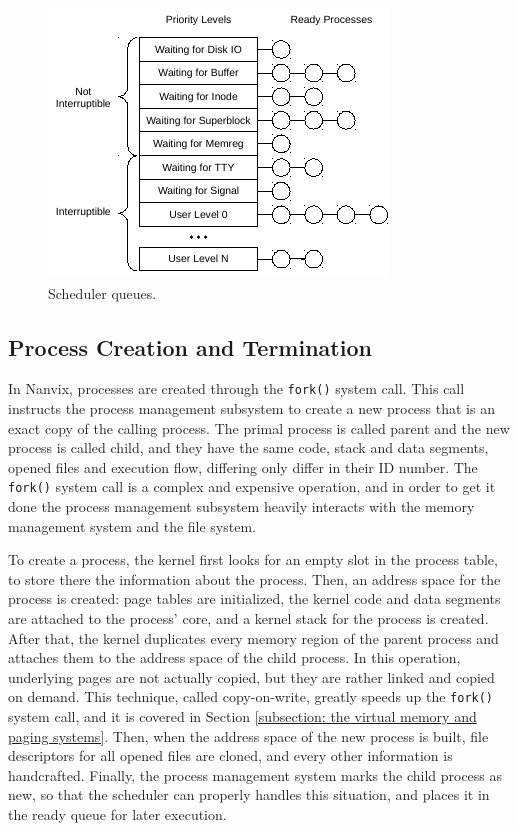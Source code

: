\documentclass[10pt,a4paper]{article}
\begin{document}
\begin{figure}[t]
	\centering
	\includegraphics[scale=1.4]{img/scheduler}
	\caption{Scheduler queues.}
	\label{figure: scheduler}
\end{figure}

\subsection{Process Creation and Termination}

In Nanvix, processes are created through the \texttt{fork()} system call. This call instructs the process management subsystem to create a new process that is an exact copy of the calling process. The primal process is called parent and the new process is called child, and they have the same code, stack and data segments, opened files and execution flow, differing only differ in their ID number. The \texttt{fork()} system call is a complex and expensive operation, and in order to get it done the process management subsystem heavily interacts with the memory management system and the file system.

To create a process, the kernel first looks for an empty slot in the process table, to store there the information about the process. Then, an address space for the process is created: page tables are initialized, the kernel code and data segments are attached to the process' core, and a kernel stack for the process is created. After that, the kernel duplicates every memory region of the parent process and attaches them to the address space of the child process. In this operation, underlying pages are not actually copied, but they are rather linked and copied on demand. This technique, called copy-on-write, greatly speeds up the \texttt{fork()} system call, and it is covered in Section \ref{subsection: the virtual memory and paging systems}. Then, when the address space of the new process is built, file descriptors for all opened files are cloned, and every other information is handcrafted. Finally, the process management system marks the child process as new, so that the scheduler can properly handles this situation, and places it in the ready queue for later execution.
\end{document}
